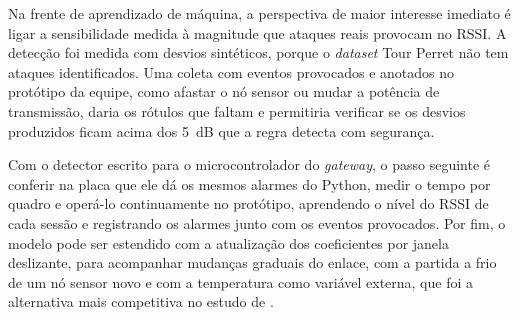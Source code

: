 Na frente de aprendizado de máquina, a perspectiva de maior interesse imediato
é ligar a sensibilidade medida à magnitude que ataques reais provocam no RSSI.
A detecção foi medida com desvios sintéticos, porque o \textit{dataset} Tour
Perret não tem ataques identificados. Uma coleta com eventos provocados e
anotados no protótipo da equipe, como afastar o nó sensor ou mudar a potência
de transmissão, daria os rótulos que faltam e permitiria verificar se os
desvios produzidos ficam acima dos 5~dB que a regra detecta com segurança.

Com o detector escrito para o microcontrolador do \textit{gateway}, o passo
seguinte é conferir na placa que ele dá os mesmos alarmes do Python, medir o
tempo por quadro e operá-lo continuamente no protótipo, aprendendo o nível do RSSI
de cada sessão e registrando os alarmes junto com os eventos provocados. Por fim, o modelo pode ser estendido com a atualização dos
coeficientes por janela deslizante, para acompanhar mudanças graduais do
enlace, com a partida a frio de um nó sensor novo e com a temperatura como
variável externa, que foi a alternativa mais competitiva no estudo de
.
